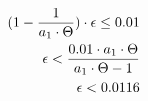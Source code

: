 \begin{equation}
        \begin{split}
                (1-\frac{1}{a_1 \cdot \Theta}) \cdot \epsilon \leq 0.01 \\
                \epsilon < \frac{0.01 \cdot a_1 \cdot \Theta}{a_1 \cdot \Theta - 1} \\
                \epsilon < 0.0116
        \end{split}
\end{equation}





        


